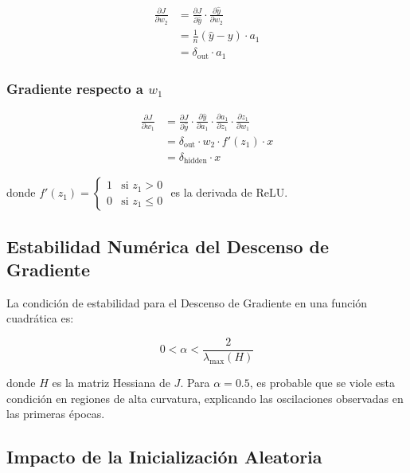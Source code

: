 \documentclass[12pt,a4paper]{article}
\theoremstyle{definition}
\begin{document}
\begin{align}
\frac{\partial J}{\partial w_2} &= \frac{\partial J}{\partial \hat{y}} \cdot \frac{\partial \hat{y}}{\partial w_2} \nonumber \\
&= \frac{1}{n}(\hat{y} - y) \cdot a_1 \nonumber \\
&= \delta_{\text{out}} \cdot a_1 \label{eq:deriv_w2}
\end{align}

\subsubsection{Gradiente respecto a $w_1$}

\begin{align}
\frac{\partial J}{\partial w_1} &= \frac{\partial J}{\partial \hat{y}} \cdot \frac{\partial \hat{y}}{\partial a_1} \cdot \frac{\partial a_1}{\partial z_1} \cdot \frac{\partial z_1}{\partial w_1} \nonumber \\
&= \delta_{\text{out}} \cdot w_2 \cdot f'(z_1) \cdot x \nonumber \\
&= \delta_{\text{hidden}} \cdot x \label{eq:deriv_w1}
\end{align}

donde $f'(z_1) = \begin{cases} 1 & \text{si } z_1 > 0 \\ 0 & \text{si } z_1 \leq 0 \end{cases}$ es la derivada de ReLU.

\subsection{Estabilidad Num\'{e}rica del Descenso de Gradiente}

La condici\'{o}n de estabilidad para el Descenso de Gradiente en una funci\'{o}n cuadr\'{a}tica es:

\begin{equation}\label{eq:estabilidad}
0 < \alpha < \frac{2}{\lambda_{\max}(H)}
\end{equation}

donde $H$ es la matriz Hessiana de $J$. Para $\alpha = 0.5$, es probable que se viole esta condici\'{o}n en regiones de alta curvatura, explicando las oscilaciones observadas en las primeras \'epocas.

\subsection{Impacto de la Inicializaci\'{o}n Aleatoria}
\end{document}
